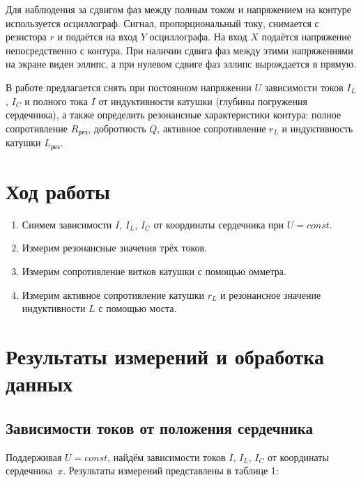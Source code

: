 \documentclass[a4paper]{article}
\theoremstyle{definition}
\theoremstyle{remark}
\begin{document}
Для наблюдения за сдвигом фаз между полным током и напряжением на контуре используется осциллограф. Сигнал, пропорциональный току, снимается с резистора $r$ и подаётся на вход $Y$ осциллографа. На вход $X$ подаётся напряжение непосредственно с контура. При наличии сдвига
фаз между этими напряжениями на экране виден эллипс, а при нулевом сдвиге фаз эллипс вырождается в прямую.
\medskip

В работе предлагается снять при постоянном напряжении $U$ зависимости токов $I_L$, $I_C$ и полного тока $I$ от индуктивности катушки (глубины погружения сердечника), а также определить резонансные характеристики контура: полное сопротивление $R_{\text{рез}}$, добротность $Q$, активное сопротивление $r_L$ и индуктивность катушки $L_{\text{рез}}$.

\section{Ход работы}

\begin{enumerate}
    \item Снимем зависимости $I$, $I_L$, $I_C$ от координаты сердечника при $U = const$.
    \item Измерим резонансные значения трёх токов.
    \item Измерим сопротивление витков катушки с помощью омметра.
    \item Измерим активное сопротивление катушки $r_L$ и резонансное значение индуктивности $L$ с помощью моста.
\end{enumerate}

\section{Результаты измерений и обработка данных}

\subsection{Зависимости токов от положения сердечника}

Поддерживая $U = const$, найдём зависимости токов $I$, $I_L$, $I_C$ от координаты сердечника~$x$. Результаты измерений представлены в таблице 1:
\end{document}
